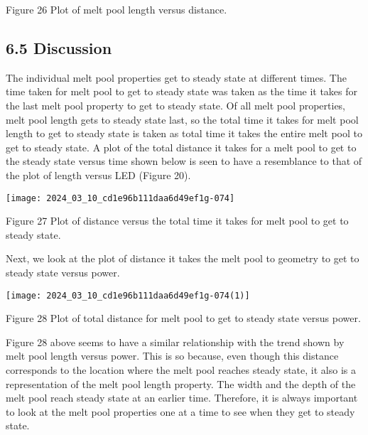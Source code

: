 \documentclass[10pt]{article}
\begin{document}
Figure 26 Plot of melt pool length versus distance.

\subsection*{6.5 Discussion}
The individual melt pool properties get to steady state at different times. The time taken for melt pool to get to steady state was taken as the time it takes for the last melt pool property to get to steady state. Of all melt pool properties, melt pool length gets to steady state last, so the total time it takes for melt pool length to get to steady state is taken as total time it takes the entire melt pool to get to steady state. A plot of the total distance it takes for a melt pool to get to the steady state versus time shown below is seen to have a resemblance to that of the plot of length versus LED (Figure 20).

\begin{center}
\texttt{[image: 2024\_03\_10\_cd1e96b111daa6d49ef1g-074]}
\end{center}

Figure 27 Plot of distance versus the total time it takes for melt pool to get to steady state.

Next, we look at the plot of distance it takes the melt pool to geometry to get to steady state versus power.

\begin{center}
\texttt{[image: 2024\_03\_10\_cd1e96b111daa6d49ef1g-074(1)]}
\end{center}

Figure 28 Plot of total distance for melt pool to get to steady state versus power.

Figure 28 above seems to have a similar relationship with the trend shown by melt pool length versus power. This is so because, even though this distance corresponds to the location where the melt pool reaches steady state, it also is a representation of the melt pool length property. The width and the depth of the melt pool reach steady state at an earlier time. Therefore, it is always important to look at the melt pool properties one at a time to see when they get to steady state.
\end{document}
